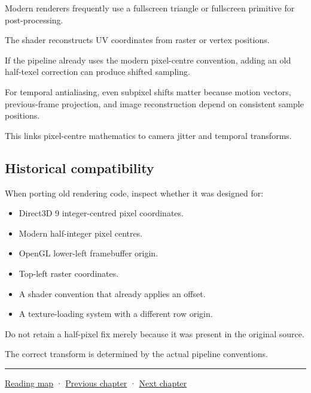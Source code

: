 Modern renderers frequently use a fullscreen triangle or fullscreen primitive for post-processing.

The shader reconstructs UV coordinates from raster or vertex positions.

If the pipeline already uses the modern pixel-centre convention, adding an old half-texel correction can produce shifted sampling.

For temporal antialiasing, even subpixel shifts matter because motion vectors, previous-frame projection, and image reconstruction depend on consistent sample positions.

This links pixel-centre mathematics to camera jitter and temporal transforms.

\subsection{Historical compatibility}\label{02-foundations-ii-ch033-historical-compatibility}

When porting old rendering code, inspect whether it was designed for:

\begin{itemize}
\tightlist
\item
  Direct3D 9 integer-centred pixel coordinates.
\item
  Modern half-integer pixel centres.
\item
  OpenGL lower-left framebuffer origin.
\item
  Top-left raster coordinates.
\item
  A shader convention that already applies an offset.
\item
  A texture-loading system with a different row origin.
\end{itemize}

Do not retain a half-pixel fix merely because it was present in the original source.

The correct transform is determined by the actual pipeline conventions.

\begin{center}\rule{0.5\linewidth}{0.5pt}\end{center}

\hyperref[volume-reading-map]{Reading map} · \hyperref[02-foundations-ii-ch032]{Previous chapter} · \hyperref[02-foundations-ii-ch034]{Next chapter}
